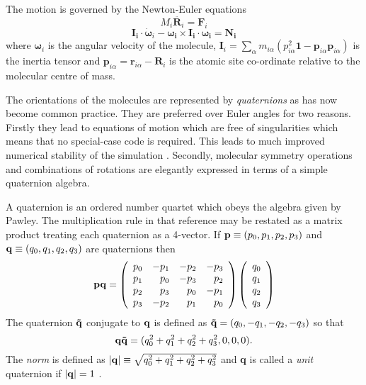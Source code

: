 The motion is governed by the Newton-Euler equations
\begin{equation}
M_i\ddot{\bm{R}_i} = \bm{F}_i \label{eqn:newton}
\end{equation}
\begin{equation}
\bm{I_i \cdot} \dot{\bm{\omega}}_i - \bm{\omega_i \times I_i \cdot
\omega_i} = \bm{N_i} \label{eqn:euler}
\end{equation}
where  $\bm{\omega}_i$ is the angular velocity of the molecule, 
$ \bm{I}_i = \sum_{\alpha} m_{i\alpha} 
( p_{i\alpha}^2 \bm{1} - \bm{p}_{i\alpha}\bm{p}_{i\alpha} ) $ 
is the inertia tensor and 
$\bm{p}_{i\alpha} = \bm{r}_{i\alpha} - \bm{R}_i $
is the atomic site co-ordinate relative to the molecular centre of mass.

\label{sec:quaternions}
The orientations of the molecules are represented by {\em quaternions}
as  has now  become common  practice.   They are  preferred over Euler
angles for two reasons. Firstly they lead to equations of motion which
are  free  of singularities   \cite{evans:77} which   means  that   no
special-case  code is required. This  leads to much improved numerical
stability      of  the  simulation  \cite{evans:77b}.   Secondly,
molecular symmetry   operations   and  combinations of  rotations  are
elegantly expressed   in    terms  of     a     simple      quaternion
algebra\cite{evans:77b,pawley:85b}.

A quaternion  is an ordered number  quartet  which obeys  the  algebra
given  by   Pawley\cite{pawley:81}.  The multiplication   rule in that
reference may be restated as a matrix product treating each quaternion
as a  4-vector.  If  ${\bf p} \equiv (p_0,p_1,p_2,p_3)$ and  ${\bf q}
\equiv  (q_0,q_1,q_2,q_3)$  are quaternions then
\begin{equation}
{\bf pq} = 
\left(
\begin{array}{rrrr}
p_0 & -p_1 & -p_2 & -p_3 \\
p_1 &  p_0 & -p_3 &  p_2 \\
p_2 &  p_3 &  p_0 & -p_1 \\
p_3 & -p_2 &  p_1 &  p_0 
\end{array}
\right) \left(
\begin{array}{r}
q_0 \\ q_1 \\ q_2 \\ q_3
\end{array}
\right)
\end{equation}
The quaternion $ {\bf \tilde{q}} $ conjugate to ${\bf q}$ is defined
as ${\bf \tilde{q}} = (q_0,-q_1,-q_2,-q_3)$ so that
\begin{equation}
{\bf q\tilde{q}} = (q_0^2+q_1^2+q_2^2+q_3^2,0,0,0) .
\label{eqn:qnorm}
\end{equation}
The {\em norm} is defined as $ |{\bf q}| \equiv
\sqrt{q_0^2+q_1^2+q_2^2+q_3^2} $ and {\bf q} is called a {\em unit}
quaternion if $ |{\bf q}| = 1 $ .  

